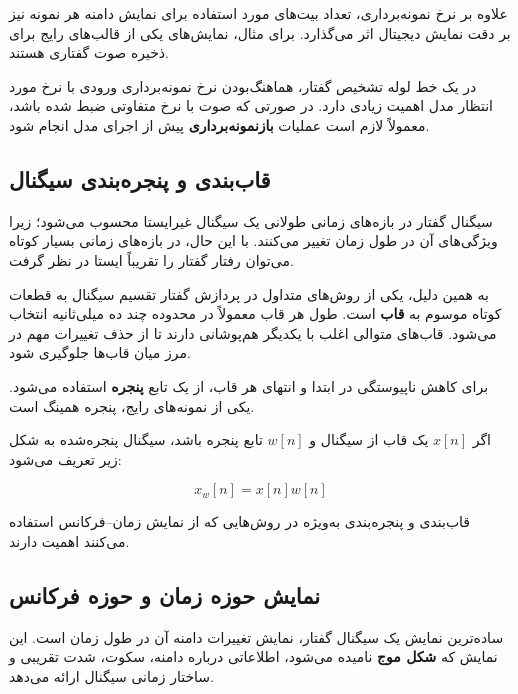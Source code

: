 علاوه بر نرخ نمونه‌برداری، تعداد بیت‌های مورد استفاده برای نمایش
دامنه هر نمونه نیز بر دقت نمایش دیجیتال اثر می‌گذارد.
برای مثال، نمایش‌های 
یکی از قالب‌های رایج برای ذخیره صوت گفتاری هستند.

در یک خط لوله تشخیص گفتار، هماهنگ‌بودن نرخ نمونه‌برداری ورودی
با نرخ مورد انتظار مدل اهمیت زیادی دارد.
در صورتی که صوت با نرخ متفاوتی ضبط شده باشد، معمولاً لازم است
عملیات
\textbf{بازنمونه‌برداری}
پیش از اجرای مدل انجام شود.


\subsection{قاب‌بندی و پنجره‌بندی سیگنال}

سیگنال گفتار در بازه‌های زمانی طولانی یک سیگنال غیرایستا
محسوب می‌شود؛ زیرا ویژگی‌های آن در طول زمان تغییر می‌کنند.
با این حال، در بازه‌های زمانی بسیار کوتاه می‌توان رفتار گفتار
را تقریباً ایستا در نظر گرفت.

به همین دلیل، یکی از روش‌های متداول در پردازش گفتار تقسیم
سیگنال به قطعات کوتاه موسوم به
\textbf{قاب}
است.
طول هر قاب معمولاً در محدوده چند ده میلی‌ثانیه انتخاب می‌شود.
قاب‌های متوالی اغلب با یکدیگر هم‌پوشانی دارند تا از حذف تغییرات
مهم در مرز میان قاب‌ها جلوگیری شود.

برای کاهش ناپیوستگی در ابتدا و انتهای هر قاب، از یک تابع
\textbf{پنجره}
استفاده می‌شود.
یکی از نمونه‌های رایج، پنجره همینگ
است.

اگر $x[n]$ یک قاب از سیگنال و $w[n]$ تابع پنجره باشد،
سیگنال پنجره‌شده به شکل زیر تعریف می‌شود:

\begin{equation}
x_w[n] = x[n]w[n]
\end{equation}

قاب‌بندی و پنجره‌بندی به‌ویژه در روش‌هایی که از نمایش
زمان--فرکانس استفاده می‌کنند اهمیت دارند.


\subsection{نمایش حوزه زمان و حوزه فرکانس}

ساده‌ترین نمایش یک سیگنال گفتار، نمایش تغییرات دامنه آن در
طول زمان است.
این نمایش که
\textbf{شکل موج}
نامیده می‌شود، اطلاعاتی درباره دامنه، سکوت، شدت تقریبی و
ساختار زمانی سیگنال ارائه می‌دهد.

